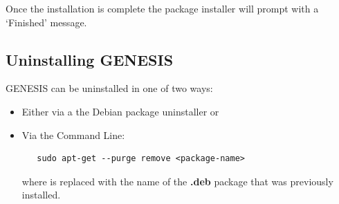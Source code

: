 \documentclass[12pt]{article}
\begin{document}
Once the installation is complete the package installer will prompt with a `{\sf Finished}' message.

\subsection*{Uninstalling GENESIS}

GENESIS can be uninstalled in one of two ways:

\begin{itemize}
   \item[] Either via a the Debian package uninstaller or
   \item[] Via the Command Line:
\begin{verbatim}
   sudo apt-get --purge remove <package-name>
\end{verbatim}
where {\tt <package-name>} is replaced with the name of the {\bf .deb} package that was previously installed. 
\end{itemize}
\end{document}
